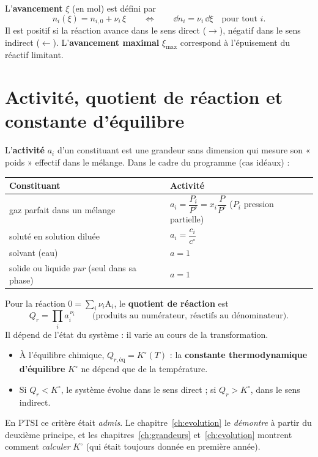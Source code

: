\begin{definition}[avancement]
L'\textbf{avancement} $\xi$ (en mol) est défini par
\[ n_i(\xi) = n_{i,0} + \nu_i\,\xi \qquad\Longleftrightarrow\qquad \dd n_i = \nu_i\,\dd\xi \quad\text{pour tout }i. \]
Il est positif si la réaction avance dans le sens direct ($\rightarrow$), négatif dans le sens indirect ($\leftarrow$). L'\textbf{avancement maximal} $\xi_{\max}$ correspond à l'épuisement du réactif limitant.
\end{definition}

\section{Activité, quotient de réaction et constante d'équilibre}

\begin{definition}[activité]
L'\textbf{activité} $a_i$ d'un constituant est une grandeur sans dimension qui mesure son « poids » effectif dans le mélange. Dans le cadre du programme (cas idéaux) :

\renewcommand{\arraystretch}{1.3}
\begin{center}
\begin{tabular}{ll}
\toprule
\textbf{Constituant} & \textbf{Activité} \\ \midrule
gaz parfait dans un mélange & $a_i = \dfrac{P_i}{P^\circ} = x_i\dfrac{P}{P^\circ}$ \quad ($P_i$ pression partielle) \\[0.6em]
soluté en solution diluée & $a_i = \dfrac{c_i}{c^\circ}$ \\[0.6em]
solvant (eau) & $a = 1$ \\
solide ou liquide \emph{pur} (seul dans sa phase) & $a = 1$ \\
\bottomrule
\end{tabular}
\end{center}
\end{definition}

\begin{definition}
Pour la réaction $0 = \sum_i \nu_i\mathrm{A}_i$, le \textbf{quotient de réaction} est
\[ Q_r = \prod_i a_i^{\,\nu_i} \qquad\text{(produits au numérateur, réactifs au dénominateur).} \]
Il dépend de l'état du système : il varie au cours de la transformation.
\end{definition}

\begin{rappel}
\begin{itemize}
  \item À l'équilibre chimique, $Q_{r,\text{éq}} = K^\circ(T)$ : la \textbf{constante thermodynamique d'équilibre} $K^\circ$ ne dépend que de la température.
  \item Si $Q_r < K^\circ$, le système évolue dans le sens direct ; si $Q_r > K^\circ$, dans le sens indirect.
\end{itemize}
En PTSI ce critère était \emph{admis}. Le chapitre~\ref{ch:evolution} le \emph{démontre} à partir du deuxième principe, et les chapitres~\ref{ch:grandeurs} et~\ref{ch:evolution} montrent comment \emph{calculer} $K^\circ$ (qui était toujours donnée en première année).
\end{rappel}


